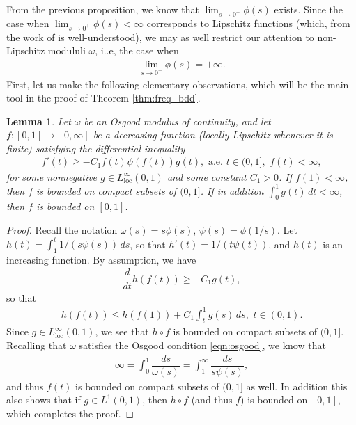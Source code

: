 \documentclass[12pt,leqno]{amsart}
\numberwithin{equation}{section}
\newtheorem{lemma}{Lemma}[section]
\theoremstyle{definition}
\newcommand{\ra}{\rightarrow}
\newcommand{\loc}{\mathrm{loc}}
\begin{document}
From the previous proposition, we know that $\lim_{s \ra 0^+} \phi(s)$ exists. Since the case when $\lim_{s \ra 0^+} \phi(s) < \infty$ corresponds to Lipschitz functions (which, from the work of \cite{GL86} is well-understood), we may as well restrict our attention to non-Lipschitz modululi $\omega$, i..e, the case when
\begin{align*}
	\lim_{s \ra 0^+} \phi(s) = + \infty.
\end{align*}
First, let us make the following elementary observations, which will be the main tool in the proof of Theorem \ref{thm:freq_bdd}.
\begin{lemma}\label{lem:growth_smooth}
	Let $\omega$ be an Osgood modulus of continuity, and let $f:[0,1] \ra [0, \infty]$ be a decreasing function (locally Lipschitz whenever it is finite) satisfying the differential inequality 
	\begin{align}\label{eqn:diff_ineq}
		f'(t) \ge - C_1 f(t) \psi(f(t)) g(t), \, \, \text{a.e. } t \in (0,1], \, \, f(t) < \infty,
	\end{align}
	for some nonnegative $g \in L^\infty_{\loc}(0,1)$ and some constant $C_1 > 0$. If $f(1) < \infty$, then $f$ is bounded on compact subsets of $(0, 1]$. If in addition $\int_0^1 g(t) \, dt < \infty$, then $f$ is bounded on $[0,1]$. 
\end{lemma}
\begin{proof}
	Recall the notation $\omega(s) = s \phi(s)$, $\psi(s) = \phi(1/s)$. Let $h(t) = \int_1^t 1/(s\psi(s)) \, ds$, so that $h'(t) = 1/(t\psi(t))$, and $h(t)$ is an increasing function. By assumption, we have 
	\begin{align*}
		\dfrac{d}{dt} h(f(t)) \ge - C_1 g(t),
	\end{align*}
	so that 
	\begin{align*}
		h(f(t))  \le h(f(1)) + C_1 \int_{t}^1 g(s) \, ds, \, \, t \in (0, 1).
	\end{align*}
	Since $g \in L^\infty_{\loc}(0,1)$, we see that $h\circ f$ is bounded on compact subsets of $(0,1]$. Recalling that $\omega$ satisfies the Osgood condition \eqref{eqn:osgood}, we know that 
	\begin{align*}
	\infty = 	\int_0^1 \dfrac{ds}{\omega (s)} = \int_1^\infty \dfrac{ds}{s\psi(s)},
	\end{align*}
	and thus $f(t)$ is bounded on compact subsets of $(0,1]$ as well. In addition this also shows that if $g \in L^1(0,1)$, then $h \circ f$ (and thus $f$) is bounded on $[0,1]$, which completes the proof.
\end{proof}
\end{document}
